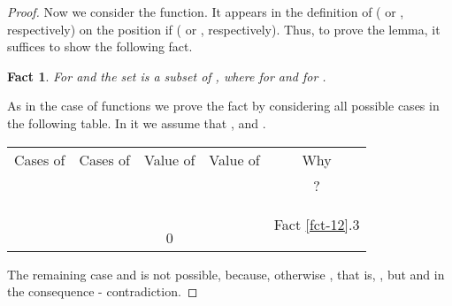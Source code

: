 \documentclass{llncs}
\newtheorem{fact}[theorem]{Fact}
\begin{document}
\begin{proof}
Now we consider the  function. It appears in the definition of 
 ( or , respectively) on the position 
 if  ( or , respectively). Thus, 
to prove the lemma, it suffices to show the following fact.
\begin{fact}
For  and  the set  is a subset of
, where  
 for  and
 for .
\end{fact}
As in the case of  functions we prove the fact by considering all 
possible cases in the following table. In it we assume that ,
 and .
\begin{center}
\begin{tabular}{||l|l||c|c||c||}
\hline\hline
      \multicolumn{1}{||c|}{Cases of} & \multicolumn{1}{|c||}{Cases of} & 
      Value of  & Value of  & Why  \\ 
        &   &   &   & 
      ? \\ \hline
\hline\multirow{2}{*}{} &  &  &   &
      \multirow{6}{*}{Fact \ref{fct-12}.3}  \\ 
\cline{2-4} &  &  &   & \\ 
\cline{1-4}  &  &  &  & \\ 
\cline{1-4} \multirow{2}{*}{} &  &  &  
& \\ 
\cline{2-4} &  &  &  & \\ 
\cline{1-4}  &  & 0 &  & \\ 
\hline\hline 
\end{tabular}
\end{center}
The remaining case  and 
 is not possible, because, otherwise , that is, , but  and in the 
consequence  - contradiction.


\end{proof}
\end{document}
